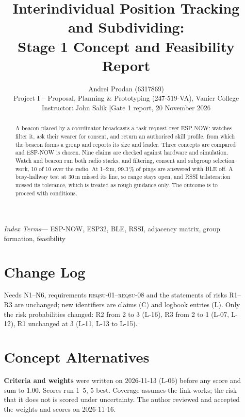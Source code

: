 \IfFileExists{IEEEtran.cls}{\documentclass[conference]{IEEEtran}}{\documentclass[10pt,twocolumn]{article}}
\providecommand{\IEEEauthorblockN}[1]{#1\\}
\providecommand{\IEEEauthorblockA}[1]{\small #1}
\newenvironment{IEEEkeywords}{\par\small\noindent\textit{Index Terms}---}{\par}
\newcommand{\req}[1]{\textsc{reqsu-}#1}
\begin{document}
\title{Interindividual Position Tracking and Subdividing:\\Stage 1 Concept and Feasibility Report}
\author{\IEEEauthorblockN{Andrei Prodan (6317869)}
\IEEEauthorblockA{Project I -- Proposal, Planning \& Prototyping (247-519-VA), Vanier College\\
Instructor: John Salik \quad|\quad Gate 1 report, 20 November 2026}}
\date{}
\maketitle

\begin{abstract}
A beacon placed by a coordinator broadcasts a task request over ESP-NOW; watches filter it, ask their wearer for consent, and return an authorised skill profile, from which the beacon forms a group and reports its size and leader. Three concepts are compared and ESP-NOW is chosen. Nine claims are checked against hardware and simulation. Watch and beacon run both radio stacks, and filtering, consent and subgroup selection work, 10 of 10 over the radio. At 1--2\,m, 99.3\,\% of pings are answered with BLE off. A busy-hallway test at 30\,m missed its line, so range stays open, and RSSI trilateration missed its tolerance, which is treated as rough guidance only. The outcome is to proceed with conditions.
\end{abstract}

\begin{IEEEkeywords}
ESP-NOW, ESP32, BLE, RSSI, adjacency matrix, group formation, feasibility
\end{IEEEkeywords}

\section{Change Log}
Needs N1--N6, requirements \req{01}--\req{08} and the statements of risks R1--R3 are unchanged; new identifiers are claims (C) and logbook entries (L). Only the risk probabilities changed: R2 from 2 to 3 (L-16), R3 from 2 to 1 (L-07, L-12), R1 unchanged at 3 (L-11, L-13 to L-15).

\section{Concept Alternatives}
\textbf{Criteria and weights} were written on 2026-11-13 (L-06) before any score and sum to 1.00. Scores run 1--5, 5 best. Coverage assumes the link works; the risk that it does not is scored under uncertainty. The author reviewed and accepted the weights and scores on 2026-11-16.
\end{document}
